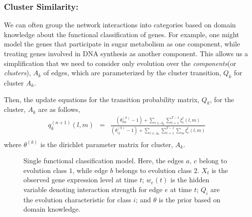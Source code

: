 \documentclass{bioinfo}
\begin{document}
\begin{methods}
\subsubsection{Cluster Similarity: } 
We can often group the network interactions into categories  based on
domain knowledge about the functional classification of genes.  For
example, one might model the genes that participate in sugar
metabolism as one 
component, while treating genes involved in DNA synthesis as another
component.  This allows us a
simplification that we need to  consider only evolution over the
\emph{components}(or \emph{clusters}), $A_k$ of edges,  which are parameterized by the
cluster transition, $Q_{k}$ for  cluster $A_k$. 

Then, the update equations for the transition probability matrix,
$Q_k$, for the cluster, $A_k$ are as follows,
\begin{eqnarray}
  \label{eq:cluster_update}
  q_{k}^{(n+1)}(l, m)   &=& \frac{(\theta^{(k)}_{lm} -1) + \sum_{e \in A_k} \sum_{t=1}^{T-1} \xi^{t}_{e}(l,m)}{ (\theta^{(k)}_{ij} -1) + \sum_{e \in A_k} \sum_{t=1}^{T-1}
   \sum_{m} \xi^{t}_{e}(l,m)} \nonumber \\
\end{eqnarray}
where $\theta^{(k)}$ is the dirichlet parameter matrix for cluster,
$A_{k}$.
\begin{figure}[h]
  \centering
  \caption{Single functional classification model. Here, the
    edges $a, \,c$ belong to evolution class $1$, while edge $b$
    belongs to evolution class $2$. $X_{t}$ is the observed gene
    expression level at time $t$; $w_{e}(t)$ is the hidden variable
    denoting interaction strength for edge $e$ at time $t$; $Q_{i}$
    are the evolution characteristic for class $i$; and $\theta$ is
    the prior based on domain knowledge.}
  \label{fig:factorial}
\end{figure}


\end{methods}
\end{document}
